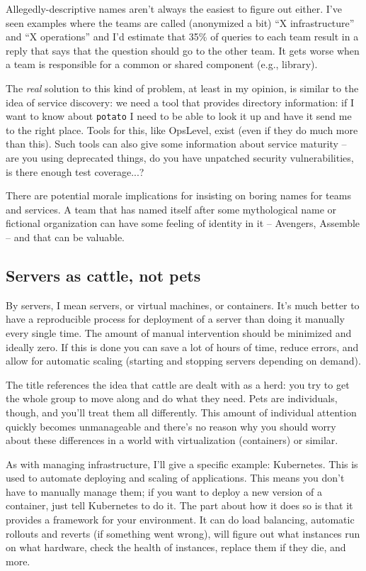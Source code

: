 Allegedly-descriptive names aren't always the easiest to figure out either. I've seen examples where the teams are called (anonymized a bit) ``X infrastructure'' and ``X operations'' and I'd estimate that 35\% of queries to each team result in a reply that says that the question should go to the other team. It gets worse when a team is responsible for a common or shared component (e.g., library). 

The \textit{real} solution to this kind of problem, at least in my opinion, is similar to the idea of service discovery: we need a tool that provides directory information: if I want to know about \texttt{potato} I need to be able to look it up and have it send me to the right place. Tools for this, like OpsLevel, exist (even if they do much more than this). Such tools can also give some information about service maturity -- are you using deprecated things, do you have unpatched security vulnerabilities, is there enough test coverage...?

There are potential morale implications for insisting on boring names for teams and services. A team that has named itself after some mythological name or fictional organization can have some feeling of identity in it -- Avengers, Assemble -- and that can be valuable. 

\subsection*{Servers as cattle, not pets}
By servers, I mean servers, or virtual machines, or containers. It's much better to have a reproducible process for deployment of a server than doing it manually every single time. The amount of manual intervention should be minimized and ideally zero. If this is done you can save a lot of hours of time, reduce errors, and allow for automatic scaling (starting and stopping servers depending on demand).

The title references the idea that cattle are dealt with as a herd: you try to get the whole group to move along and do what they need. Pets are individuals, though, and you'll treat them all differently. This amount of individual attention quickly becomes unmanageable and there's no reason why you should worry about these differences in a world with virtualization (containers) or similar. 

As with managing infrastructure, I'll give a specific example: Kubernetes. This is used to automate deploying and scaling of applications. This means you don't have to manually manage them; if you want to deploy a new version of a container, just tell Kubernetes to do it. The part about how it does so is that it provides a framework for your environment. It can do load balancing, automatic rollouts and reverts (if something went wrong), will figure out what instances run on what hardware, check the health of instances, replace them if they die, and more.

